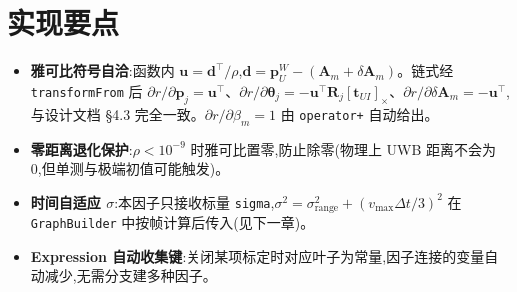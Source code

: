 \documentclass[11pt,a4paper]{report}
\newcommand{\bp}{\bm{p}}
\newcommand{\bR}{\bm{R}}
\newcommand{\bA}{\bm{A}}
\newcommand{\skewop}[1]{\left[#1\right]_{\times}}
\begin{document}
\section{实现要点}
\begin{itemize}[leftmargin=2em]
  \item \textbf{雅可比符号自洽}:函数内 $\bm{u}=\bm{d}^\top/\rho$,$\bm{d}=\bp_U^W-(\bA_m+\delta\bA_m)$。链式经 \texttt{transformFrom} 后 $\partial r/\partial\bp_j=\bm{u}^\top$、$\partial r/\partial\bm{\theta}_j=-\bm{u}^\top\bR_j\skewop{\bm{t}_{UI}}$、$\partial r/\partial\delta\bA_m=-\bm{u}^\top$,与设计文档 \S 4.3 完全一致。$\partial r/\partial\beta_m=1$ 由 \texttt{operator+} 自动给出。
  \item \textbf{零距离退化保护}:$\rho<10^{-9}$ 时雅可比置零,防止除零(物理上 UWB 距离不会为 0,但单测与极端初值可能触发)。
  \item \textbf{时间自适应 $\sigma$}:本因子只接收标量 \texttt{sigma},$\sigma^2=\sigma_{\text{range}}^2+(v_{\max}\Delta t/3)^2$ 在 \texttt{GraphBuilder} 中按帧计算后传入(见下一章)。
  \item \textbf{Expression 自动收集键}:关闭某项标定时对应叶子为常量,因子连接的变量自动减少,无需分支建多种因子。
\end{itemize}
\end{document}
